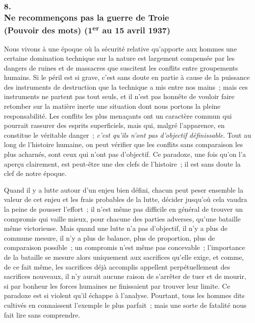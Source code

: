 \documentclass[french,twoside]{book} %
\begin{document}
\subsubsection[{8. Ne recommençons pas la guerre de Troie, (Pouvoir des mots) (1er au 15 avril 1937)}]{8. \\
Ne recommençons pas la guerre de Troie \\
(Pouvoir des mots) (1\textsuperscript{er} au 15 avril 1937)}
\noindent \par
Nous vivons à une époque où la sécurité relative qu'apporte aux hommes une certaine domination technique sur la nature est largement compensée par les dangers de ruines et de massacres que suscitent les conflits entre grou­pements humains. Si le péril est si grave, c'est sans doute en partie à cause de la puissance des instruments de destruction que la technique a mis entre nos mains ; mais ces instruments ne partent pas tout seuls, et il n'est pas honnête de vouloir faire retomber sur la matière inerte une situation dont nous portons la pleine responsabilité. Les conflits les plus menaçants ont un caractère commun qui pourrait rassurer des esprits superficiels, mais qui, malgré l'apparence, en constitue le véritable danger ; {\itshape c'est qu'ils n'ont pas d'objectif définissable}. Tout au long de l'histoire humaine, on peut vérifier que les conflits sans comparaison les plus acharnés, sont ceux qui n'ont pas d'objectif. Ce paradoxe, une fois qu'on l'a aperçu clairement, est peut-être une des clefs de l'histoire ; il est sans doute la clef de notre époque.\par
Quand il y a lutte autour d'un enjeu bien défini, chacun peut peser ensemble la valeur de cet enjeu et les frais probables de la lutte, décider jusqu'où cela vaudra la peine de pousser l'effort ; il n'est même pas difficile en général de trouver un compromis qui vaille mieux, pour chacune des parties adverses, qu'une bataille même victorieuse. Mais quand une lutte n'a pas d'objectif, il n'y a plus de commune mesure, il n'y a plus de balance, plus de proportion, plus de comparaison possible ; un compromis n'est même pas concevable ; l'importance de la bataille se mesure alors uniquement aux sacri­fices qu'elle exige, et comme, de ce fait même, les sacrifices déjà accomplis appellent perpétuellement des sacrifices nouveaux, il n'y aurait aucune raison de s'arrêter de tuer et de mourir, si par bonheur les forces humaines ne finissaient par trouver leur limite. Ce paradoxe est si violent qu'il échappe à l'analyse. Pourtant, tous les hommes dits cultivés en connaissent l'exemple le plus parfait ; mais une sorte de fatalité nous fait lire sans comprendre.\par
\end{document}
